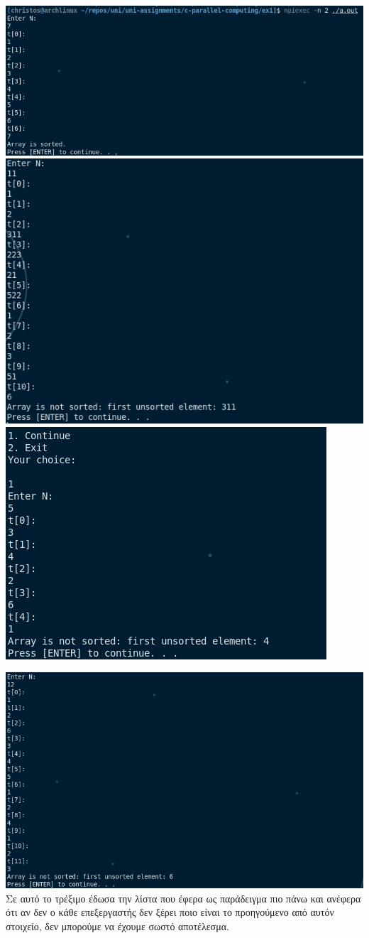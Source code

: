 \documentclass{article}
\begin{document}
\includegraphics[width=\textwidth]{res/exmpl1.png}
\includegraphics[width=\textwidth]{res/exmpl2.png}
\includegraphics[width=\textwidth]{res/exmpl3.png}

\includegraphics[width=\textwidth]{res/exmpl4.png}
Σε αυτό το τρέξιμο έδωσα την λίστα που έφερα ως παράδειγμα πιο πάνω
και ανέφερα ότι αν δεν ο κάθε επεξεργαστής δεν ξέρει ποιο είναι το προηγούμενο από
αυτόν στοιχείο, δεν μπορούμε να έχουμε σωστό αποτέλεσμα.
\end{document}
